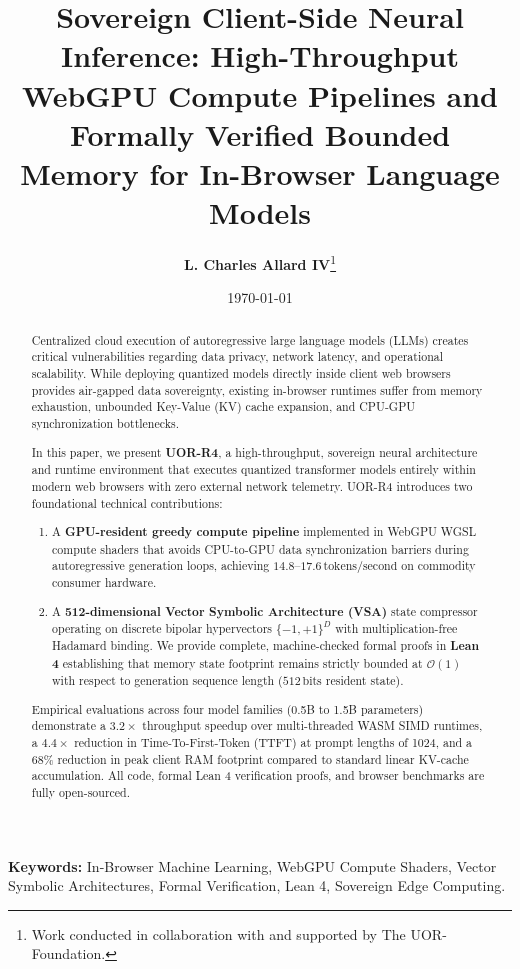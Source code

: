 \documentclass[11pt,a4paper]{article}
\title{\textbf{Sovereign Client-Side Neural Inference: High-Throughput WebGPU Compute Pipelines and Formally Verified Bounded Memory for In-Browser Language Models}}
\author{\textbf{L. Charles Allard IV}\thanks{Work conducted in collaboration with and supported by The UOR-Foundation.}}
\date{\today}
\theoremstyle{plain}
\theoremstyle{definition}
\theoremstyle{remark}
\begin{document}
\maketitle

\begin{abstract}
Centralized cloud execution of autoregressive large language models (LLMs) creates critical vulnerabilities regarding data privacy, network latency, and operational scalability. While deploying quantized models directly inside client web browsers provides air-gapped data sovereignty, existing in-browser runtimes suffer from memory exhaustion, unbounded Key-Value (KV) cache expansion, and CPU-GPU synchronization bottlenecks. 

In this paper, we present \textbf{UOR-R4}, a high-throughput, sovereign neural architecture and runtime environment that executes quantized transformer models entirely within modern web browsers with zero external network telemetry. UOR-R4 introduces two foundational technical contributions:
\begin{enumerate}
    \item A \textbf{GPU-resident greedy compute pipeline} implemented in WebGPU WGSL compute shaders that avoids CPU-to-GPU data synchronization barriers during autoregressive generation loops, achieving $14.8\text{--}17.6\,\text{tokens/second}$ on commodity consumer hardware.
    \item A \textbf{512-dimensional Vector Symbolic Architecture (VSA)} state compressor operating on discrete bipolar hypervectors $\{-1, +1\}^D$ with multiplication-free Hadamard binding. We provide complete, machine-checked formal proofs in \textbf{Lean 4} establishing that memory state footprint remains strictly bounded at $\mathcal{O}(1)$ with respect to generation sequence length ($512\,\text{bits}$ resident state).
\end{enumerate}

Empirical evaluations across four model families (0.5B to 1.5B parameters) demonstrate a $3.2\times$ throughput speedup over multi-threaded WASM SIMD runtimes, a $4.4\times$ reduction in Time-To-First-Token (TTFT) at prompt lengths of 1024, and a $68\%$ reduction in peak client RAM footprint compared to standard linear KV-cache accumulation. All code, formal Lean 4 verification proofs, and browser benchmarks are fully open-sourced.
\end{abstract}

\vspace{1em}
\noindent\textbf{Keywords:} In-Browser Machine Learning, WebGPU Compute Shaders, Vector Symbolic Architectures, Formal Verification, Lean 4, Sovereign Edge Computing.
\end{document}
